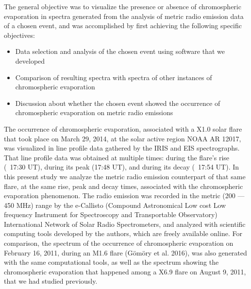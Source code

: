 \documentclass[a0paper,portrait]{baposter}
\begin{document}
\begin{poster}



{The general objective was to visualize the presence or absence of chromospheric evaporation in spectra
    generated from the analysis of metric radio emission data of a chosen event, and was accomplished
    by first achieving the following specific objectives:
    \begin{itemize}
        \setlength\itemsep{0.01mm}
        \item Data selection and analysis of the chosen event using software that we developed
        \item Comparison of resulting spectra with spectra of other instances of chromospheric evaporation
        \item Discussion about whether the chosen event showed the occurrence of chromospheric evaporation
            on metric radio emissions
    \end{itemize}

}

{The occurrence of chromospheric evaporation, associated with a X1.0 solar flare
    that took place on March 29, 2014, at the solar active region NOAA AR 12017,
    was visualized in line profile data gathered by the IRIS and EIS spectrographs.
    That line profile data was obtained at multiple times: during the flare’s rise
    (~17:30 UT), during its peak (17:48 UT), and during its decay (~17:54 UT).
    In this present study we analyze the metric radio emission counterpart of that
    same flare, at the same rise, peak and decay times, associated with the chromospheric
    evaporation phenomenon. The radio emission was recorded in the metric (200 --- 450 MHz)
    range by the e-Callisto (Compound Astronomical Low cost Low frequency Instrument for
    Spectroscopy and Transportable Observatory) International Network of Solar Radio Spectrometers,
    and analyzed with scientific computing tools developed by the authors, which are freely available online.
    For comparison, the spectrum of the occurrence of chromospheric evaporation on February 16, 2011,
    during an M1.6 flare (Gömöry et al. 2016), was also generated with the same computational tools, as well as
    the spectrum showing the chromospheric evaporation that happened among a X6.9 flare on August 9, 2011,
    that we had studied previously.
}


\end{poster}
\end{document}
